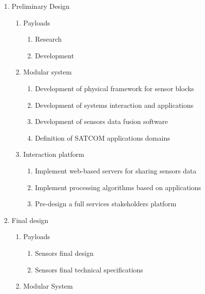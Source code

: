 \begin{enumerate}[label*=\arabic*.]
	\begin{enumerate}[label*=\arabic*.]
		\item Preliminary Design
		\begin{enumerate}[label*=\arabic*.]
			\item Payloads
			\begin{enumerate}[label*=\arabic*.]
				\item Research
				\item Development
			\end{enumerate}
			\item Modular system
			\begin{enumerate}[label*=\arabic*.]
				\item Development of physical framework for sensor blocks
				\item Development of systems interaction and applications
				\item Development of sensors data fusion software
				\item Definition of SATCOM applications domains
			\end{enumerate}
			\item Interaction platform
			\begin{enumerate}[label*=\arabic*.]
				\item Implement web-based servers for sharing sensors data
				\item Implement processing algorithms based on applications
				\item Pre-design a full services stakeholders platform 
			\end{enumerate}
		\end{enumerate}
		\item Final design
		\begin{enumerate}[label*=\arabic*.]
			\item Payloads 
			\begin{enumerate}[label*=\arabic*.]
				\item Sensors final design
				\item Sensors final technical specifications
			\end{enumerate}
			\item Modular System

\end{enumerate}
\end{enumerate}
\end{enumerate}
